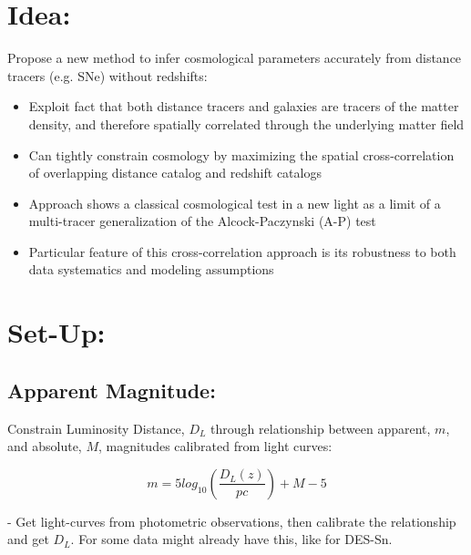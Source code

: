 \documentclass{article}
\begin{document}
\section{Idea:}

Propose a new method to infer cosmological parameters accurately from distance tracers (e.g. SNe) without redshifts:
 
 \begin{itemize}

  \item Exploit  fact that both distance tracers and galaxies are tracers of the matter density, and therefore spatially correlated through the underlying matter field
  
  \item Can tightly constrain cosmology by maximizing the spatial cross-correlation of overlapping distance catalog and redshift catalogs
  
  \item Approach shows a classical cosmological test in a new light as a limit of a multi-tracer generalization of the Alcock-Paczynski (A-P) test
  
  \item Particular feature of this cross-correlation approach is its robustness to both data systematics and modeling assumptions
       
\end{itemize}


\section{Set-Up:}

\subsection{Apparent Magnitude:}

Constrain Luminosity Distance, $D_L$ through relationship between apparent, $m$, and absolute, $M$, magnitudes calibrated from light curves: 

\begin{equation}
m = 5 log_{10}(\frac{D_{L}(z)}{pc}) + M - 5
\end{equation}

- Get light-curves from photometric observations, then calibrate the relationship and get $D_L$. For some data might already have this, like for DES-Sn.
\end{document}
